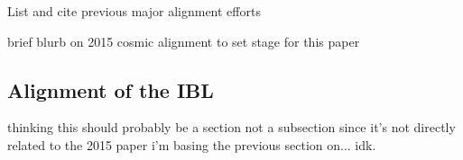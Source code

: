 List and cite previous major alignment efforts

brief blurb on 2015 cosmic alignment to set stage for this paper

\subsection{Alignment of the IBL}\label{align:ibl}
thinking this should probably be a section not a subsection since it's not directly related to the 2015 paper i'm basing the previous section on... idk.
